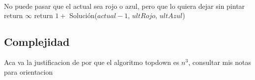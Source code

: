 \begin{algorithm}[H]
\begin{algorithmic}
 \\
    \Comment No puede pasar que el actual sea rojo o azul, pero que lo quiera dejar sin pintar
        \State return $\infty$
    \Else 
        \State return $1 + $  Solución($actual - 1$, $ultRojo$, $ultAzul$)
    \EndIf
\EndProcedure
\end{algorithmic}
\end{algorithm}


\subsection{Complejidad}

Aca va la justificacion de por que el algoritmo topdown es $n^3$, consultar mis notas para orientacion
